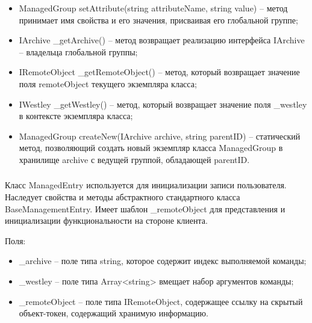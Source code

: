 \begin{itemize}
  \item ManagedGroup setAttribute(string attributeName, string value) – метод принимает имя свойства и его значения, присваивая его глобальной группе;
  \item IArchive \_getArchive() – метод возвращает реализацию интерфейса IArchive – владельца глобальной группы;
  \item IRemoteObject \_getRemoteObject() – метод, который возвращает значение поля remoteObject текущего экземпляра класса;
  \item IWestley \_getWestley() – метод, который возвращает значение поля \_westley в контексте экземпляра класса;
  \item ManagedGroup createNew(IArchive archive, string parentID) – статический метод, позволяющий создать новый экземпляр класса ManagedGroup в хранилище archive с ведущей группой, обладающей parentID.
\end{itemize}

\subsubsection{}
\label{sub:arch_and_mod:probab_net:managedentry}

Класс ManagedEntry используется для инициализации записи пользователя. Наследует свойства и методы абстрактного стандартного класса BaseManagementEntry. Имеет шаблон \_remoteObject для представления и инициализации функциональности на стороне клиента.

Поля:
\begin{itemize}
  \item \_archive – поле типа string, которое содержит индекс выполняемой команды;
  \item \_westley – поле типа Array<string> вмещает набор аргументов команды;
  \item \_remoteObject – поле типа IRemoteObject, содержащее ссылку на скрытый объект-токен, содержащий хранимую информацию.
\end{itemize}

